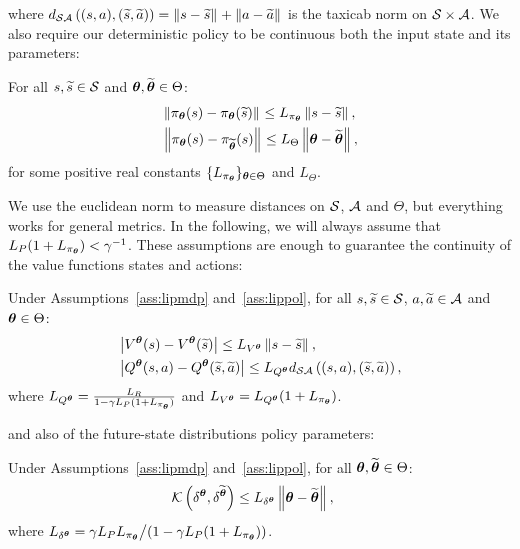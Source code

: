 %
\noindent where $d_{\mathcal{S}\mathcal{A}}\left((s,a),(\widetilde{s},\widetilde{a})\right) = \left\|s-\widetilde{s}\right\|_{} + \left\|a-\widetilde{a}\right\|_{}$ is the taxicab norm on $\mathcal{S}\times\mathcal{A}$.
We also require our deterministic policy to be continuous both \wrt the input state and its parameters:
%
\begin{assumption}\label{ass:lippol}
	For all $s,\widetilde{s}\in\mathcal{S}$ and $\boldsymbol{\theta},\widetilde{\boldsymbol{\theta}}\in\Theta$:
	\begin{align}
	&\left\|\pi_{\boldsymbol{\theta}}(s) - \pi_{\boldsymbol{\theta}}(\widetilde{s})\right\|_{} \leq L_{\pi_{\boldsymbol{\theta}}}\left\|s-\widetilde{s}\right\|_{}, \\
	&\left\|\pi_{\boldsymbol{\theta}}(s) - \pi_{\widetilde{\boldsymbol{\theta}}}(s)\right\|_{} \leq L_{\Theta}\left\|\boldsymbol{\theta}-\widetilde{\boldsymbol{\theta}}\right\|_{},
	\end{align}
	for some positive real constants $\{L_{\pi_{\boldsymbol{\theta}}}\}_{\boldsymbol{\theta}\in\Theta}$ and $L_{\Theta}$.
\end{assumption}
%
\noindent We use the euclidean norm to measure distances on $\mathcal{S}$, $\mathcal{A}$ and $\Theta$, but everything works for general metrics.
In the following, we will always assume that ${L_{P}(1+L_{\pi_{\boldsymbol{\theta}}}) < \gamma^{-1}}$.
These assumptions are enough to guarantee the continuity of the value functions \wrt states and actions:
%
\begin{lemma}\label{lem:lipval}
	Under Assumptions~\ref{ass:lipmdp} and~\ref{ass:lippol}, for all $s,\widetilde{s}\in\mathcal{S}$, $a,\widetilde{a}\in\mathcal{A}$ and $\boldsymbol{\theta}\in\Theta$:
	\begin{align}
	&\left|V^{\boldsymbol{\theta}}(s) - V^{\boldsymbol{\theta}}(\widetilde{s})\right| \leq L_{V^{\boldsymbol{\theta}}}\left\|s-\widetilde{s}\right\|_{}, \\
	&\left|Q^{\boldsymbol{\theta}}(s,a) - Q^{\boldsymbol{\theta}}(\widetilde{s},\widetilde{a})\right| \leq L_{Q^{\boldsymbol{\theta}}}d_{\mathcal{S}\mathcal{A}}\left((s,a),(\widetilde{s},\widetilde{a})\right),
	\end{align}
	where $L_{Q^{\boldsymbol{\theta}}} = \frac{L_{R}}{1-\gamma L_{P}(1+L_{\pi_{\boldsymbol{\theta}}})}$ and $L_{V^{\boldsymbol{\theta}}} = L_{Q^{\boldsymbol{\theta}}}(1+L_{\pi_{\boldsymbol{\theta}}})$.
\end{lemma}
%
\noindent and also of the future-state distributions \wrt policy parameters:
%
\begin{lemma}\label{lem:lipfut}
	Under Assumptions~\ref{ass:lipmdp} and~\ref{ass:lippol}, for all $\boldsymbol{\theta},\widetilde{\boldsymbol{\theta}}\in\Theta$:
	\begin{align}
	&\mathcal{K}\left(\delta^{\boldsymbol{\theta}},\delta^{\widetilde{\boldsymbol{\theta}}}\right) \leq L_{\delta^{\boldsymbol{\theta}}}\left\|\boldsymbol{\theta}-\widetilde{\boldsymbol{\theta}}\right\|_{},
	\end{align}
	where $L_{\delta^{\boldsymbol{\theta}}} = {\gamma L_{P}L_{\pi_{\boldsymbol{\theta}}}}\big/{\left(1-\gamma L_{P}(1+L_{\pi_{\boldsymbol{\theta}}})\right)}$.
\end{lemma}

